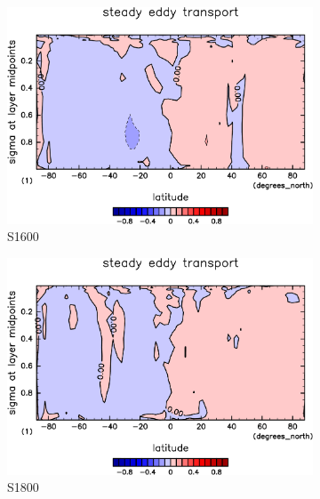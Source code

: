 \documentclass[body]{subfiles}
\begin{document}
\begin{figure}[t]
\begin{subfigure}{.4\textwidth}
		\includegraphics[width=\columnwidth]{S1600/MeriHeatTransTest@latentEn_SE,time=3650:4015-crop-rotate.pdf}
		\caption{S1600}\label{潜熱停滞性擾乱S1600}
	\end{subfigure}
	\begin{subfigure}{.4\textwidth}
		\centering
		\includegraphics[width=\columnwidth]{S1800/MeriHeatTransTest@latentEn_SE,time=3650:4015-crop-rotate.pdf}
		\caption{S1800}\label{潜熱停滞性擾乱S1800}
	\end{subfigure}
	\begin{subfigure}{.4\textwidth}
		\centering

\end{subfigure}
\end{figure}
\end{document}
